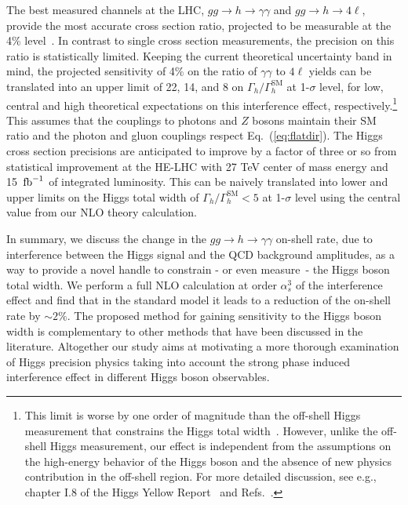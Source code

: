 The best measured channels at the LHC, $gg\to h\to \gamma\gamma$ and $gg\to h \to 4\ell$, provide the most accurate cross section ratio, projected to 
 be measurable at the 4\% level~\cite{ATL-PHYS-PUB-2014-016}.   In contrast to single cross section measurements, the precision on this ratio is statistically limited.
Keeping the current theoretical uncertainty band in mind, the projected sensitivity of 4\% on the ratio of $\gamma\gamma$ to $4\ell$ yields
can be translated into an upper  limit of 22, 14, and 8 on $\Gamma_h/\Gamma_h^\mathrm{SM}$ at 1-$\sigma$ level, for low, central and high theoretical expectations
on this interference effect, respectively.\footnote{This limit is worse by one order of magnitude than the off-shell Higgs measurement that constrains the Higgs total width~\cite{Kauer:2012hd,Caola:2013yja,Campbell:2013una}. However, unlike the off-shell Higgs measurement, our effect is independent from the assumptions on the high-energy behavior of the Higgs boson and the absence of new physics contribution in the off-shell region. 
For more detailed discussion, see e.g., chapter I.8 of the Higgs Yellow Report~\cite{deFlorian:2016spz} and Refs.~\cite{Englert:2014aca,Logan:2014ppa}.} 
This assumes that the couplings to photons and $Z$ bosons maintain their SM ratio and the photon and gluon couplings respect Eq.~(\ref{eq:flatdir}).
The Higgs cross section precisions are anticipated to improve by a factor of three or so from statistical improvement at the HE-LHC with 27 TeV center of mass energy and 15 $\,{\rm fb}^{-1}$ of integrated luminosity. %
This can be naively translated into  lower and upper limits on the Higgs total width of $\Gamma_h/\Gamma_h^\mathrm{SM}< 5$ at 1-$\sigma$ level using the central value from our NLO theory calculation. 

In summary, we discuss the change in the $gg\to h\to \gamma\gamma$ on-shell rate, due to interference between the Higgs signal and the QCD background amplitudes, as a way to provide a novel handle to constrain - or even measure~-  the Higgs boson total width. 
We perform a full NLO calculation at order $\alpha_s^3$ of the interference effect and find that in the standard model it leads to a reduction of the on-shell rate by $\sim 2\%$. 
The proposed  method for gaining sensitivity to the Higgs boson width is complementary to other methods that have been discussed in the literature. 
Altogether our study aims at motivating  a more thorough examination of Higgs precision physics  taking into account the  strong phase induced interference effect in different Higgs boson observables.



